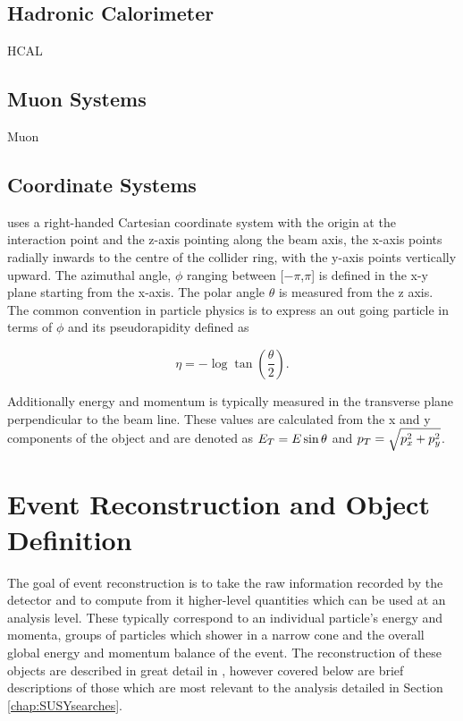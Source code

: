 \subsection{Hadronic Calorimeter}
\label{subsec:hcal} 
 HCAL \\
 
\subsection{Muon Systems}
\label{subsec:muonsystems} 
 Muon \\ 

\subsection{Coordinate Systems}
\label{subsec:coordinatesystem}

\CMS uses a right-handed Cartesian coordinate system with the origin at the interaction point and the z-axis pointing along the beam axis, the x-axis points radially inwards to the centre of the collider ring, with the y-axis points vertically upward. The azimuthal angle, $\phi$ ranging between [$-\pi$,$\pi$] is defined in the x-y plane starting from the x-axis. The polar angle $\theta$ is measured from the z axis. The common convention in particle physics is to express an out going particle in terms of $\phi$ and its pseudorapidity defined as

\begin{equation}
\eta = -\log\tan\left(\frac{\theta}{2}\right).
\end{equation}

Additionally energy and momentum is typically measured in the transverse plane perpendicular to the beam line. These values are calculated from the x and y components of the object and are denoted as $E_{T} = E\sin\theta$ and $p_{T} = \sqrt{p^{2}_{x}+p^{2}_{y}}$. 

\section{Event Reconstruction and Object Definition}
\label{sec:cmsobjects}

The goal of event reconstruction is to take the raw information recorded by the detector and to compute from it higher-level quantities which can be used at an analysis level. These typically correspond to an individual particle's energy and momenta, groups of particles which shower in a narrow cone and the overall global energy and momentum balance of the event. The reconstruction of these objects are described in great detail in \cite{CMS_TDR_PHYS_vol1}, however covered below are brief descriptions of those which are most relevant to the analysis detailed in Section \ref{chap:SUSYsearches}.

